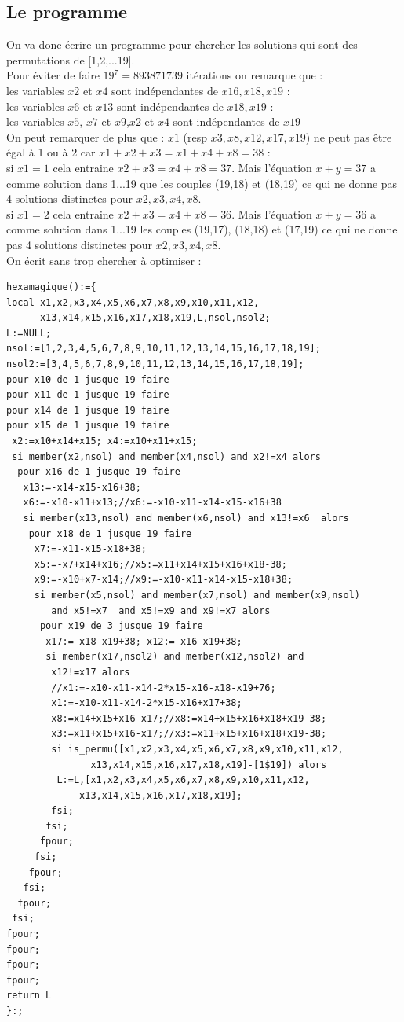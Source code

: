 \documentclass[a4paper,11pt]{book}
\begin{document}
\subsection{Le programme}
On va donc \'ecrire un programme pour chercher les solutions qui sont des 
permutations de [1,2,...19].\\
Pour \'eviter de faire $19^7=893871739$ it\'erations on remarque que :\\ 
les variables $x2$ et $x4$ sont ind\'ependantes de $x16,x18,x19$ :\\
les variables $x6$ et $x13$ sont ind\'ependantes de $x18,x19$ :\\
les variables $x5$, $x7$ et $x9$,$x2$ et $x4$ sont ind\'ependantes de $x19$ \\ 
On peut remarquer de plus que :
 $x1$ (resp $x3,x8,x12,x17,x19$) ne peut pas 
\^etre \'egal \`a  1 ou \`a 2 car $x1+x2+x3=x1+x4+x8=38$ :\\
 si $x1=1$ cela entraine $x2+x3=x4+x8=37$. Mais l'\'equation $x+y=37$ a
comme solution dans 1...19 que les couples (19,18) et (18,19) ce qui ne
donne pas 4 solutions distinctes pour $x2,x3,x4,x8$.\\
si $x1=2$ cela entraine $x2+x3=x4+x8=36$. Mais l'\'equation $x+y=36$ a 
comme solution dans 1...19  les couples (19,17), (18,18) et (17,19) ce qui ne
donne pas 4 solutions distinctes pour $x2,x3,x4,x8$.\\
 On \'ecrit sans trop chercher \`a optimiser :
\begin{verbatim}
hexamagique():={
local x1,x2,x3,x4,x5,x6,x7,x8,x9,x10,x11,x12,
      x13,x14,x15,x16,x17,x18,x19,L,nsol,nsol2;
L:=NULL;
nsol:=[1,2,3,4,5,6,7,8,9,10,11,12,13,14,15,16,17,18,19];
nsol2:=[3,4,5,6,7,8,9,10,11,12,13,14,15,16,17,18,19];
pour x10 de 1 jusque 19 faire
pour x11 de 1 jusque 19 faire
pour x14 de 1 jusque 19 faire
pour x15 de 1 jusque 19 faire
 x2:=x10+x14+x15; x4:=x10+x11+x15;
 si member(x2,nsol) and member(x4,nsol) and x2!=x4 alors
  pour x16 de 1 jusque 19 faire
   x13:=-x14-x15-x16+38;
   x6:=-x10-x11+x13;//x6:=-x10-x11-x14-x15-x16+38
   si member(x13,nsol) and member(x6,nsol) and x13!=x6  alors
    pour x18 de 1 jusque 19 faire
     x7:=-x11-x15-x18+38;
     x5:=-x7+x14+x16;//x5:=x11+x14+x15+x16+x18-38;
     x9:=-x10+x7-x14;//x9:=-x10-x11-x14-x15-x18+38;
     si member(x5,nsol) and member(x7,nsol) and member(x9,nsol) 
        and x5!=x7  and x5!=x9 and x9!=x7 alors
      pour x19 de 3 jusque 19 faire
       x17:=-x18-x19+38; x12:=-x16-x19+38;
       si member(x17,nsol2) and member(x12,nsol2) and 
        x12!=x17 alors
        //x1:=-x10-x11-x14-2*x15-x16-x18-x19+76;
        x1:=-x10-x11-x14-2*x15-x16+x17+38;
        x8:=x14+x15+x16-x17;//x8:=x14+x15+x16+x18+x19-38;
        x3:=x11+x15+x16-x17;//x3:=x11+x15+x16+x18+x19-38;
        si is_permu([x1,x2,x3,x4,x5,x6,x7,x8,x9,x10,x11,x12,
               x13,x14,x15,x16,x17,x18,x19]-[1$19]) alors
         L:=L,[x1,x2,x3,x4,x5,x6,x7,x8,x9,x10,x11,x12,
             x13,x14,x15,x16,x17,x18,x19];
        fsi;
       fsi;
      fpour;
     fsi;
    fpour;
   fsi;
  fpour;
 fsi;
fpour;
fpour;
fpour;
fpour;
return L
}:;
\end{verbatim}
\end{document}

